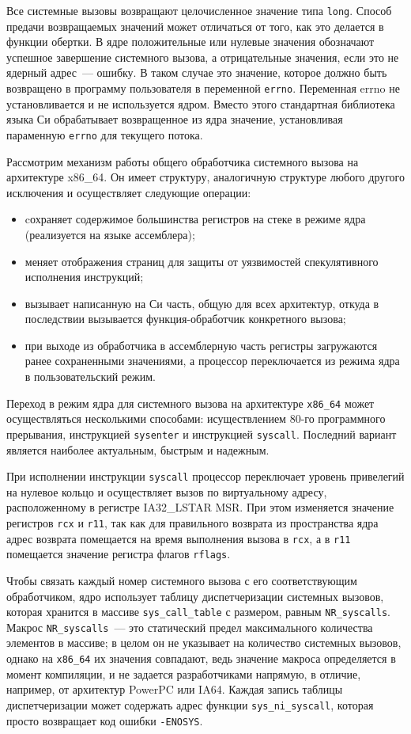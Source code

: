 Все системные вызовы возвращают целочисленное значение типа \texttt{long}.
Способ предачи возвращаемых значений может отличаться от того, как это делается
в функции обертки. В ядре положительные или нулевые значения обозначают успешное
завершение системного вызова, а отрицательные значения, если это не ядерный
адрес~--- ошибку. В таком случае это значение, которое должно быть возвращено в
программу пользователя в переменной \texttt{errno}. Переменная errno не
установливается и не используется ядром. Вместо этого стандартная библиотека
языка Си обрабатывает возвращенное из ядра значение, установливая параменную
\texttt{errno} для текущего потока.

Рассмотрим механизм работы общего обработчика системного вызова на архитектуре
x86\_64. Он имеет структуру, аналогичную структуре любого другого исключения и
осуществляет следующие операции:
\begin{itemize}
\item cохраняет содержимое большинства регистров на стеке в режиме ядра
  (реализуется на языке ассемблера);
\item меняет отображения страниц для защиты от уязвимостей спекулятивного
  исполнения инструкций;
\item вызывает написанную на Си часть, общую для всех архитектур, откуда в
  последствии вызывается функция-обработчик конкретного вызова;
\item при выходе из обработчика в ассемблерную часть регистры загружаются ранее
  сохраненными значениями, а процессор переключается из режима ядра в
  пользовательский режим.
\end{itemize}

Переход в режим ядра для системного вызова на архитектуре \texttt{x86\_64} может
осуществляться несколькими способами: исуществлением 80-го программного
прерывания, инструкцией \texttt{sysenter} и инструкцией \texttt{syscall}.
Последний вариант является наиболее актуальным, быстрым и надежным.

При исполнении инструкции \texttt{syscall} процессор переключает уровень
привелегий на нулевое кольцо и осуществляет вызов по виртуальному адресу,
расположенному в регистре IA32\_LSTAR MSR. При этом изменяется значение
регистров \texttt{rcx} и \texttt{r11}, так как для правильного возврата из
пространства ядра адрес возврата помещается на время выполнения вызова в
\texttt{rcx}, а в \texttt{r11} помещается значение регистра флагов
\texttt{rflags}.

Чтобы связать каждый номер системного вызова с его соответствующим обработчиком,
ядро использует таблицу диспетчеризации системных вызовов, которая хранится в
массиве \texttt{sys\_call\_table} с размером, равным \texttt{NR\_syscalls}.
Макрос \texttt{NR\_syscalls}~--- это статический предел максимального количества
элементов в массиве; в целом он не указывает на количество системных вызовов,
однако на \texttt{x86\_64} их значения совпадают, ведь значение макроса
определяется в момент компиляции, и не задается разработчиками напрямую, в
отличие, например, от архитектур PowerPC или IA64. Каждая запись таблицы
диспетчеризации может содержать адрес функции \texttt{sys\_ni\_syscall}, которая
просто возвращает код ошибки \texttt{-ENOSYS}.

